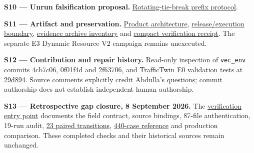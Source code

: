\documentclass[11pt,a4paper]{article}
\begin{document}
\label{source-s10}

\textbf{S10 --- Unrun falsification proposal.} \href{\detokenize{../../evaluation/common_target_mechanism_audit_2026-09-07/TIEBREAK_PREFIX_PROPOSAL.md}}{Rotating-tie-break prefix protocol}.

\label{source-s11}

\textbf{S11 --- Artifact and preservation.} \href{\detokenize{../../architecture_current_release.md}}{Product architecture}, \href{\detokenize{../../quality/final_release_status_20260815.md}}{release/execution boundary}, \href{\detokenize{../../evaluation/vec_followup_2026-09-07/ARCHIVE_INVENTORY.json}}{evidence archive inventory} and \href{\detokenize{../../evaluation/vec_followup_2026-09-07/COMPACT_VERIFICATION.json}}{compact verification receipt}. The separate E3 Dynamic Resource V2 campaign remains unexecuted.

\label{source-s12}

\textbf{S12 --- Contribution and repair history.} Read-only inspection of \texttt{vec\_env} commits \href{\detokenize{https://github.com/Abdulla4akash/vec_env/commit/4cb7c06aab1b455d68f71ea9143172463784dea9}}{4cb7c06}, \href{\detokenize{https://github.com/Abdulla4akash/vec_env/commit/0f01f4d2082d3e8b735e74a873095ab8eeba37cc}}{0f01f4d} and \href{\detokenize{https://github.com/Abdulla4akash/vec_env/commit/2f63706f46319433a2ba3af1df97afd0e56a95d1}}{2f63706}, and TrafficTwin \href{\detokenize{https://github.com/Abdulla4akash/traffictwin/blob/29d8945862b7df1bd5d7879ba1d980a388f6be0d/tests/test_validate_e0_smoke.py}}{E0 validation tests at 29d894}. Source comments explicitly credit Abdulla's questions; commit authorship does not establish independent human authorship.

\label{source-s13}

\textbf{S13 --- Retrospective gap closure, 8 September 2026.} The \href{\detokenize{../gap_closure_2026-09-08/verification/README.md}}{verification entry point} documents the field contract, source bindings, 87-file authentication, 19-run audit, \href{\detokenize{../gap_closure_2026-09-08/verification/results/OUTCOME_TRANSITIONS.json}}{23 paired transitions}, \href{\detokenize{../gap_closure_2026-09-08/verification/results/KERNEL_RESULTS.json}}{440-case reference} and production comparison. These completed checks and their historical sources remain unchanged.
\end{document}
